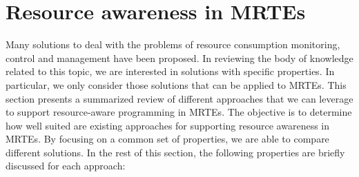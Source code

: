 \section{Resource awareness in MRTEs} \label{sec:resource-awareness-related-work}

Many solutions to deal with the problems of resource consumption monitoring, control and management have been proposed.
In reviewing the body of knowledge related to this topic, we are interested in solutions with specific properties.
In particular, we only consider those solutions that can be applied to MRTEs.
This section presents a summarized review of different approaches that we can leverage to support resource-aware programming in MRTEs.
The objective is to determine how well suited are existing approaches for supporting resource awareness in MRTEs.
By focusing on a common set of properties, we are able to compare different solutions.
In the rest of this section, the following properties are briefly discussed for each approach: 

